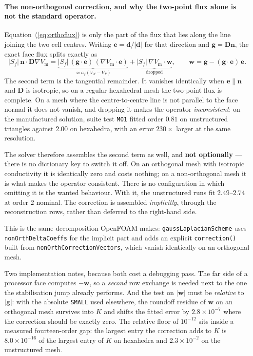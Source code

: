 \documentclass[11pt,a4paper]{article}
\newcommand{\code}[1]{\texttt{\small #1}}
\newcommand{\Vm}{V_{\text{m}}}
\newcommand{\Dten}{\mathbf{D}}
\newcommand{\grad}{\nabla}
\begin{document}
\paragraph{The non-orthogonal correction, and why the two-point flux alone is not
the standard operator.}
Equation~(\ref{eq:orthoflux}) is only the part of the flux that lies along the
line joining the two cell centres. Writing $\mathbf{e}=\mathbf{d}/|\mathbf{d}|$
for that direction and $\mathbf{g}=\Dten\mathbf{n}$, the exact face flux splits
exactly as
\begin{equation}
  |S_f|\,\mathbf{n}\cdot\Dten\grad\Vm
  = \underbrace{|S_f|\,(\mathbf{g}\cdot\mathbf{e})\,(\grad\Vm\cdot\mathbf{e})}
    _{\textstyle \approx a_f (V_N-V_P)}
  + \underbrace{|S_f|\,\grad\Vm\cdot\mathbf{w}}_{\textstyle \text{dropped}},
  \qquad
  \mathbf{w}=\mathbf{g}-(\mathbf{g}\cdot\mathbf{e})\,\mathbf{e}.
\end{equation}
The second term is the tangential remainder. It vanishes identically when
$\mathbf{e}\parallel\mathbf{n}$ and $\Dten$ is isotropic, so on a regular
hexahedral mesh the two-point flux is complete. On a mesh where the centre-to-centre
line is not parallel to the face normal it does not vanish, and dropping it makes
the operator \emph{inconsistent}: on the manufactured solution, suite test
\code{M01} fitted order $0.81$ on unstructured triangles against $2.00$ on
hexahedra, with an error $230\times$ larger at the same resolution.

The solver therefore assembles the second term as well, and \textbf{not
optionally} --- there is no dictionary key to switch it off. On an orthogonal mesh
with isotropic conductivity it is identically zero and costs nothing; on a
non-orthogonal mesh it is what makes the operator consistent. There is no
configuration in which omitting it is the wanted behaviour. With it, the
unstructured runs fit $2.49$--$2.74$ at order $2$ nominal. The correction is
assembled \emph{implicitly}, through the reconstruction rows, rather than deferred
to the right-hand side.

This is the same decomposition OpenFOAM makes: \code{gaussLaplacianScheme} uses
\code{nonOrthDeltaCoeffs} for the implicit part and adds an explicit
\code{correction()} built from \code{nonOrthCorrectionVectors}, which vanish
identically on an orthogonal mesh.

Two implementation notes, because both cost a debugging pass. The far side of a
processor face computes $-\mathbf{w}$, so a \emph{second} row exchange is needed
next to the one the stabilisation jump already performs. And the test on
$|\mathbf{w}|$ must be \emph{relative} to $|\mathbf{g}|$: with the absolute
\code{SMALL} used elsewhere, the roundoff residue of $\mathbf{w}$ on an orthogonal
mesh survives into $K$ and shifts the fitted error by $2.8\times10^{-7}$ where the
correction should be exactly zero. The relative floor of $10^{-12}$ sits inside a
measured fourteen-order gap: the largest entry the correction adds to $K$ is
$8.0\times10^{-16}$ of the largest entry of $K$ on hexahedra and
$2.3\times10^{-2}$ on the unstructured mesh.
\end{document}
